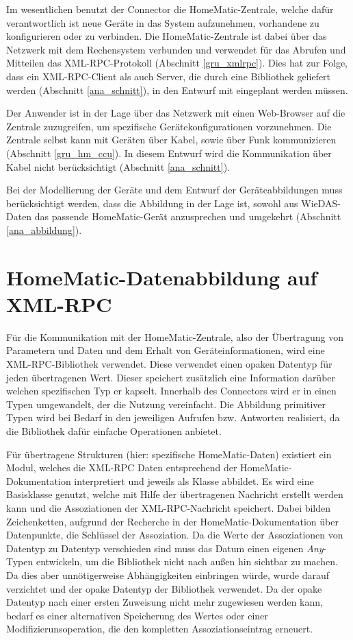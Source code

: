 Im wesentlichen benutzt der Connector die HomeMatic-Zentrale, welche dafür verantwortlich
ist neue Geräte in das System aufzunehmen, vorhandene zu konfigurieren oder zu
verbinden.
Die HomeMatic-Zentrale ist dabei über das Netzwerk mit dem Rechensystem verbunden und
verwendet für das Abrufen und Mitteilen das XML-RPC-Protokoll (Abschnitt \ref{gru_xmlrpc}).
Dies hat zur Folge, dass ein XML-RPC-Client als auch Server, die durch eine Bibliothek
geliefert werden (Abschnitt \ref{ana_schnitt}), in den Entwurf mit eingeplant werden müssen.

Der Anwender ist in der Lage über das Netzwerk mit einen Web-Browser auf die Zentrale
zuzugreifen, um spezifische Gerätekonfigurationen vorzunehmen.
Die Zentrale selbst kann mit Geräten über Kabel, sowie über Funk kommunizieren
(Abschnitt \ref{gru_hm_ccu}).
In diesem Entwurf wird die Kommunikation über Kabel nicht berücksichtigt (Abschnitt \ref{ana_schnitt}).

Bei der Modellierung der Geräte und dem Entwurf der Geräteabbildungen muss berücksichtigt
werden, dass die Abbildung in der Lage ist, sowohl aus WieDAS-Daten das passende
HomeMatic-Gerät anzusprechen und umgekehrt (Abschnitt \ref{ana_abbildung}).

\section{HomeMatic-Datenabbildung auf XML-RPC}
\label{des_xmlrpc_abbildung}

Für die Kommunikation mit der HomeMatic-Zentrale, also der Übertragung von Parametern
und Daten und dem Erhalt von Geräteinformationen, wird eine XML-RPC-Bibliothek verwendet.
Diese verwendet einen opaken Datentyp für jeden übertragenen Wert.
Dieser speichert zusätzlich eine Information darüber welchen spezifischen Typ er kapselt.
Innerhalb des Connectors wird er in einen Typen umgewandelt, der die Nutzung vereinfacht.
Die Abbildung primitiver Typen wird bei Bedarf in den jeweiligen Aufrufen bzw. Antworten
realisiert, da die Bibliothek dafür einfache Operationen anbietet.

Für übertragene Strukturen (hier: spezifische HomeMatic-Daten) existiert ein Modul,
welches die XML-RPC Daten entsprechend der HomeMatic-Dokumentation interpretiert und
jeweils als Klasse abbildet.
Es wird eine Basisklasse genutzt, welche mit Hilfe der übertragenen Nachricht erstellt
werden kann und die Assoziationen der XML-RPC-Nachricht speichert.
Dabei bilden Zeichenketten, aufgrund der Recherche in der HomeMatic-Dokumentation über Datenpunkte, die Schlüssel
der Assoziation.
Da die Werte der Assoziationen von Datentyp zu Datentyp verschieden sind muss das Datum
einen eigenen \emph{Any}-Typen entwickeln, um die Bibliothek nicht nach außen hin sichtbar
zu machen.
Da dies aber unnötigerweise Abhängigkeiten einbringen würde, wurde darauf verzichtet und
der opake Datentyp der Bibliothek verwendet.
Da der opake Datentyp nach einer ersten Zuweisung nicht mehr zugewiesen werden kann,
bedarf es einer alternativen Speicherung des Wertes oder einer Modifizierunsoperation,
die den kompletten Assoziationseintrag erneuert.

